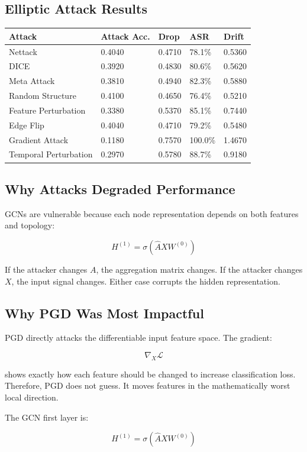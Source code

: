 \documentclass[12pt,a4paper]{article}
\begin{document}
\subsection{Elliptic Attack Results}
\begin{longtable}{p{1.6in}p{0.8in}p{0.8in}p{0.8in}p{0.8in}}
\toprule
\textbf{Attack} & \textbf{Attack Acc.} & \textbf{Drop} & \textbf{ASR} & \textbf{Drift}\\
\midrule
Nettack & 0.4040 & 0.4710 & 78.1\% & 0.5360\\
DICE & 0.3920 & 0.4830 & 80.6\% & 0.5620\\
Meta Attack & 0.3810 & 0.4940 & 82.3\% & 0.5880\\
Random Structure & 0.4100 & 0.4650 & 76.4\% & 0.5210\\
Feature Perturbation & 0.3380 & 0.5370 & 85.1\% & 0.7440\\
Edge Flip & 0.4040 & 0.4710 & 79.2\% & 0.5480\\
Gradient Attack & 0.1180 & 0.7570 & 100.0\% & 1.4670\\
Temporal Perturbation & 0.2970 & 0.5780 & 88.7\% & 0.9180\\
\bottomrule
\end{longtable}

\subsection{Why Attacks Degraded Performance}
GCNs are vulnerable because each node representation depends on both features and topology:

$$
H^{(1)}=\sigma(\hat{A}XW^{(0)})
$$

If the attacker changes $A$, the aggregation matrix changes. If the attacker changes $X$, the input signal changes. Either case corrupts the hidden representation.

\subsection{Why PGD Was Most Impactful}
PGD directly attacks the differentiable input feature space. The gradient:

$$
\nabla_X\mathcal{L}
$$

shows exactly how each feature should be changed to increase classification loss. Therefore, PGD does not guess. It moves features in the mathematically worst local direction.

The GCN first layer is:

$$
H^{(1)}=\sigma(\hat{A}XW^{(0)})
$$
\end{document}

